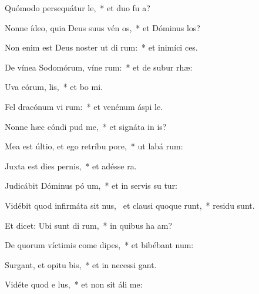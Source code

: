 \item Quómodo persequátur  le,~* et duo fu  a?
\item Nonne ídeo, quia Deus suus vén os,~* et Dóminus  los?
\item Non enim est Deus noster ut di rum:~* et inimíci   ces.
\item De vínea Sodomórum, víne rum:~* et de subur rhæ:
\item Uva eórum,  lis,~* et bo mi.
\item Fel dracónum vi rum:~* et venénum áspi le.
\item Nonne hæc cóndi  pud me,~* et signáta in  is?
\item Mea est últio, et ego retríbu  pore,~* ut labá  rum:
\item Juxta est dies pernis,~* et adésse  ra.
\item Judicábit Dóminus pó um,~* et in servis su tur:
\item Vidébit quod infirmáta sit nus,~\pscross{} et clausi quoque runt,~* residu  sunt.
\item Et dicet: Ubi sunt di rum,~* in quibus ha am?
\item De quorum víctimis come dipes,~* et bibébant  num:
\item Surgant, et opitu bis,~* et in necessi  gant.
\item Vidéte quod e  lus,~* et non sit áli   me:
